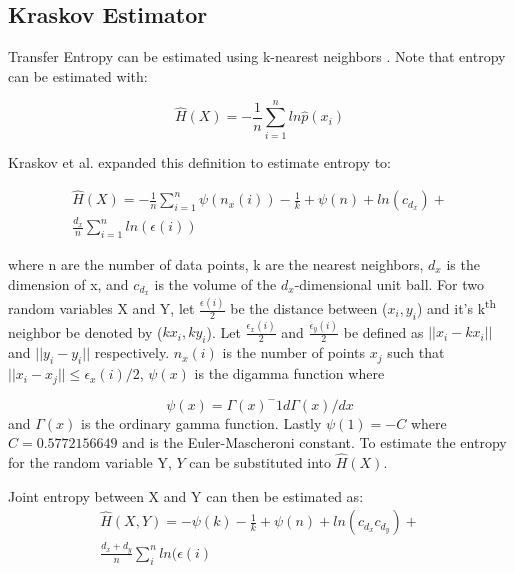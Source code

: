 \documentclass[conference]{IEEEtran}
\begin{document}
\subsection{Kraskov Estimator}

Transfer Entropy can be estimated using k-nearest neighbors \cite{kraskovEstimator}. Note that entropy can be estimated with:

\begin{equation}\hat{H}(X) = - \frac{1}{n} \sum^n_{i=1} ln \hat{p}(x_i) \end{equation}

Kraskov et al. expanded this definition to estimate entropy to:

\setlength{\arraycolsep}{0.0em}
\begin{eqnarray}
\hat{H}(X) = - \frac{1}{n} \sum^n_{i=1} \psi(n_x(i)) - \frac{1}{k} + \psi(n) + ln (c_{d_x}) + \nonumber\\
 \frac{d_x}{n} \sum^n_{i=1} ln (\epsilon(i))
\end{eqnarray}
\setlength{\arraycolsep}{1pt}

\noindent where n are the number of data points, k are the nearest neighbors, \(d_x\) is the dimension of x, and \(c_{d_x}\) is the volume of the \(d_x\)-dimensional unit ball. For two random variables X and Y, let \( \frac{\epsilon(i)}{2} \) be the distance between (\(x_i,y_i\)) and it's k\textsuperscript{th} neighbor be denoted by (\(kx_i,ky_i\)). Let \(\frac{\epsilon_x(i)}{2}\) and  \(\frac{\epsilon_y(i)}{2}\) be defined as \( ||x_i-kx_i ||\) and \( ||y_i-y_i || \) respectively. \(n_x(i)\) is the number of points \(x_j\) such that \(||x_i - x_j  || \leq \epsilon_x(i)/2\), \(\psi(x)\) is the digamma function where

\begin{equation}\psi(x) = \Gamma(x)^-1 d\Gamma(x) / dx \end{equation}
and  \(\Gamma(x)\) is the ordinary gamma function. Lastly \(\psi(1) = -C\) where \(C=0.5772156649\) and is the Euler-Mascheroni constant. To estimate the entropy for the random variable Y, \(Y\) can be substituted into \(\hat{H}(X)\).

Joint entropy between X and Y can then be estimated as:
\setlength{\arraycolsep}{0.0em}
\begin{eqnarray}
\hat{H}(X,Y) = - \psi(k) - \frac{1}{k} + \psi(n) + ln(c_{d_x} c_{d_y})  +  \nonumber\\
\frac{d_x + d_y}{n} \sum^n_i ln(\epsilon(i)
\end{eqnarray}
\setlength{\arraycolsep}{1pt}
\end{document}

